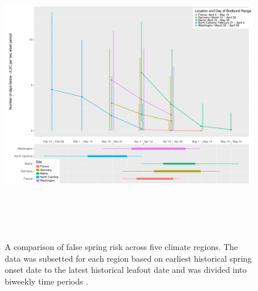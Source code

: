 \documentclass{article}\usepackage[]{graphicx}\usepackage[]{color}
\begin{document}
\begin{figure} [H] 
\begin{center}
\includegraphics[width=16cm, height=13cm]{..//figure/Boxplot_RegRisk_biweekly.pdf} 
\caption{A comparison of false spring risk across five climate regions. The data was subsetted for each region based on earliest historical spring onset date to the latest historical leafout date and was divided into biweekly time periods \citep{Schaber2005, White2009, Soudani2012, USA-NPN2016}.}\label{fig:regional} 
\end{center}
\end{figure}
\end{document}
